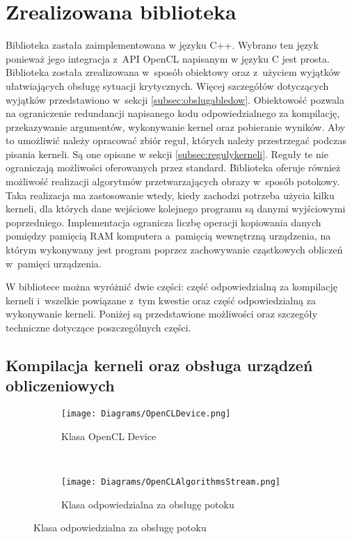 \section{Zrealizowana biblioteka}  
\label{sec:biblioteka}

Biblioteka zastała zaimplementowana w języku C++. Wybrano ten język ponieważ jego integracja z~API OpenCL napisanym w języku C jest prosta. Biblioteka została zrealizowana w~sposób obiektowy oraz z~użyciem wyjątków ułatwiających obsługę sytuacji krytycznych. Więcej szczegółów dotyczących wyjątków przedstawiono w~sekcji \ref{subsec:obslugabledow}. Obiektowość pozwala na ograniczenie redundancji napisanego kodu odpowiedzialnego za kompilację, przekazywanie argumentów, wykonywanie kernel oraz pobieranie wyników. Aby to umożliwić należy opracować zbiór reguł, których należy przestrzegać podczas pisania kerneli. Są one opisane w sekcji \ref{subsec:regulykerneli}. Reguły te nie ograniczają możliwości oferowanych przez standard. Biblioteka oferuje również możliwość realizacji algorytmów przetwarzających obrazy w~sposób potokowy. Taka realizacja ma zastosowanie wtedy, kiedy zachodzi potrzeba użycia kilku kerneli, dla których dane wejściowe kolejnego programu są danymi wyjściowymi poprzedniego. Implementacja  ogranicza liczbę operacji kopiowania danych pomiędzy pamięcią RAM komputera a~pamięcią wewnętrzną urządzenia, na którym wykonywany jest program poprzez zachowywanie cząstkowych obliczeń w~pamięci urządzenia.

W bibliotece można wyróżnić dwie części: część odpowiedzialną za kompilację kerneli i~wszelkie powiązane z~tym kwestie oraz część odpowiedzialną za wykonywanie kerneli.
Poniżej są przedstawione możliwości oraz szczegóły techniczne dotyczące poszczególnych części.

\subsection{Kompilacja kerneli oraz obsługa urządzeń obliczeniowych}
\label{subsec:kompilacjakerneli}

\begin{figure}[h]

\begin{center}
\begin{subfigure}[t]{0.3\textwidth}
\texttt{[image: Diagrams/OpenCLDevice.png]}
\caption{Klasa OpenCL Device}
\label{fig:opencldevice}
\end{subfigure}
~
\begin{subfigure}[t]{0.3\textwidth}
\texttt{[image: Diagrams/OpenCLAlgorithmsStream.png]}
\caption{Klasa odpowiedzialna za obsługę potoku}
\label{fig:openCLAlgorithmsStream}
\end{subfigure}
\end{center}

\label{fig:opencldeviceIopenCLAglorithmsStream}
\end{figure}

